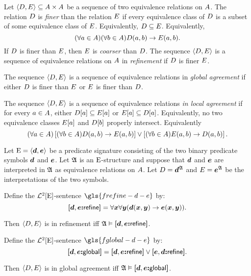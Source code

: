 \begin{definition}
Let $\left\langle D, E \right\rangle \subseteq {A\times A}$ be a sequence of two
equivalence relations on $A$.
The relation $D$ is \emph{finer} than the relation $E$ if every
equivalence class of $D$ is a subset of some equivalence class of $E$.
Equivalently, $D \subseteq E$. Equivalently,
\[
  (\forall a \in A)(\forall b \in A) D(a, b) \rightarrow
  E(a, b).
\]
If $D$ is finer than $E$, then $E$ is \emph{coarser} than $D$.
The sequence $\left\langle D, E \right\rangle$ is a sequence of equivalence relations on
$A$ in \emph{refinement} if $D$ is finer $E$.

The sequence $\left\langle D, E \right\rangle$ is a sequence of equivalence relations in
\emph{global agreement} if either $D$ is finer than $E$ or $E$ is
finer than $D$.

The sequence $\left\langle D, E \right\rangle$ is a sequence of equivalence relations
\emph{in local agreement} if for every $a \in A$, 
either $D[a] \subseteq E[a]$ or $E[a] \subseteq D[a]$.
Equivalently, no two equivalence classes $E[a]$ and $D[b]$ properly
intersect.
Equivalently
\[
  (\forall a \in A)
  \left[(\forall b \in A) D(a, b) \rightarrow E(a, b)\right]
  \lor \left[(\forall b \in A) E(a, b) \rightarrow
  D(a, b)\right].
\]
\end{definition}

Let $\mathrm{E} = \left\langle \bm{d}, \bm{e} \right\rangle$ be a predicate signature consisting of the two binary
predicate symbols $\bm{d}$ and $\bm{e}$.
Let $\mathfrak{A}$ is an $\mathrm{E}$-structure and suppose that $\bm{d}$ and $\bm{e}$ are
interpreted in $\mathfrak{A}$ as equivalence relations on $A$.
Let $D = \bm{d}^{\mathfrak{A}}$ and $E = \bm{e}^{\mathfrak{A}}$ be the interpretations of
the two symbols.

\begin{definition}
Define the $\mathcal{L}^{2}[\mathrm{E}]$-sentence $\gls{frefine-d-e}$ by:
\[
  {\bm{[}\bm{d},\bm{e}\mathord{\bm{:}}\mathsf{refine}\bm{]}} = \forall\bm{x} \forall\bm{y} (\bm{d}(\bm{x}, \bm{y}) \rightarrow \bm{e}(\bm{x}, \bm{y})).
\]
\end{definition}
Then $\left\langle D, E \right\rangle$ is in refinement iff 
$\mathfrak{A} \vDash {\bm{[}\bm{d},\bm{e}\mathord{\bm{:}}\mathsf{refine}\bm{]}}$.

\begin{definition}
Define the $\mathcal{L}^{2}[\mathrm{E}]$-sentence $\gls{fglobal-d-e}$ by:
\[
  {\bm{[}\bm{d},\bm{e}\mathord{\bm{:}}\mathsf{global}\bm{]}} = {\bm{[}\bm{d},\bm{e}\mathord{\bm{:}}\mathsf{refine}\bm{]}} \lor {\bm{[}\bm{e},\bm{d}\mathord{\bm{:}}\mathsf{refine}\bm{]}}.
\]
\end{definition}
Then $\left\langle D, E \right\rangle$ is in global agreement iff
$\mathfrak{A} \vDash {\bm{[}\bm{d},\bm{e}\mathord{\bm{:}}\mathsf{global}\bm{]}}$.

